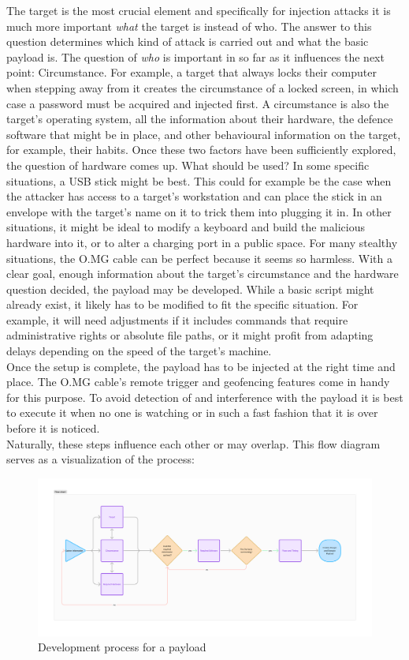 The target is the most crucial element and specifically for injection attacks it is much more important \emph{what} the target is instead of who. The answer to this question determines which kind of attack is carried out and what the basic payload is. The question of \emph{who} is important in so far as it influences the next point: Circumstance. For example, a target that always locks their computer when stepping away from it creates the circumstance of a locked screen, in which case a password must be acquired and injected first. A circumstance is also the target's operating system, all the information about their hardware, the defence software that might be in place, and other behavioural information on the target, for example, their habits. Once these two factors have been sufficiently explored, the question of hardware comes up. What should be used? In some specific situations, a USB stick might be best. This could for example be the case when the attacker has access to a target's workstation and can place the stick in an envelope with the target's name on it to trick them into plugging it in. In other situations, it might be ideal to modify a keyboard and build the malicious hardware into it, or to alter a charging port in a public space. For many stealthy situations, the O.MG cable can be perfect because it seems so harmless. With a clear goal, enough information about the target's circumstance and the hardware question decided, the payload may be developed. While a basic script might already exist, it likely has to be modified to fit the specific situation. For example, it will need adjustments if it includes commands that require administrative rights or absolute file paths, or it might profit from adapting delays depending on the speed of the target's machine. \\
Once the setup is complete, the payload has to be injected at the right time and place. The O.MG cable's remote trigger and geofencing features come in handy for this purpose. To avoid detection of and interference with the payload it is best to execute it when no one is watching or in such a fast fashion that it is over before it is noticed.\\
Naturally, these steps influence each other or may overlap. This flow diagram serves as a visualization of the process:


\begin{figure}[H]
    \centering
    \includegraphics[width=1\linewidth]{visuals/attack_dev.png}
    \caption{Development process for a payload}
\end{figure}


